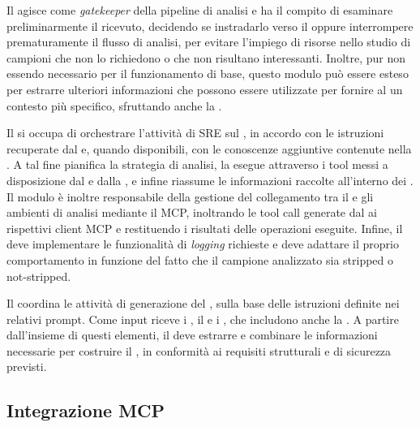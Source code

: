 
Il \classifier{} agisce come \emph{gatekeeper} della pipeline di analisi e ha il compito di esaminare preliminarmente il \binary{} ricevuto, decidendo se instradarlo verso il \sreagent{} oppure interrompere prematuramente il flusso di analisi, per evitare l'impiego di risorse nello studio di campioni che non lo richiedono o che non risultano interessanti. Inoltre, pur non essendo necessario per il funzionamento di base, questo modulo può essere esteso per estrarre ulteriori informazioni che possono essere utilizzate per fornire al \sreagent{} un contesto più specifico, sfruttando anche la \kb{}.


Il \sreagent{} si occupa di orchestrare l'attività di SRE sul \binary{}, in accordo con le istruzioni recuperate dal \prompt{} e, quando disponibili, con le conoscenze aggiuntive contenute nella \kb{}. A tal fine pianifica la strategia di analisi, la esegue attraverso i tool messi a disposizione dal \sreframework{} e dalla \sandbox{}, e infine riassume le informazioni raccolte all'interno dei \report{}. Il modulo è inoltre responsabile della gestione del collegamento tra il \llmclient{} e gli ambienti di analisi mediante il MCP, inoltrando le tool call generate dal \llm{} ai rispettivi client MCP e restituendo i risultati delle operazioni eseguite. Infine, il \sreagent{} deve implementare le funzionalità di \emph{logging} richieste e deve adattare il proprio comportamento in funzione del fatto che il campione analizzato sia stripped o not-stripped.

Il \codeagent{} coordina le attività di generazione del \capture{}, sulla base delle istruzioni definite nei relativi prompt. Come input riceve i \report{}, il \schema{} e i \templates{}, che includono anche la \interface{}. A partire dall'insieme di questi elementi, il \codeagent{} deve estrarre e combinare le informazioni necessarie per costruire il \capture{}, in conformità ai requisiti strutturali e di sicurezza previsti.


\subsection{Integrazione MCP} %

